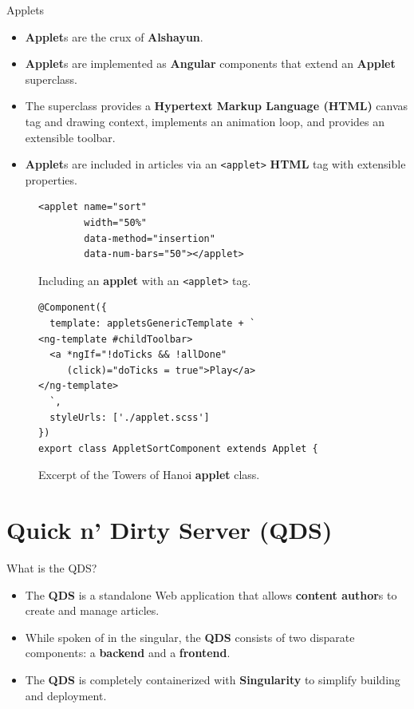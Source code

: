\documentclass{beamer}
\begin{document}
\begin{frame}{Applets}
    \begin{itemize}
        \item \textbf{Applet}s are the crux of \textbf{Alshayun}.
        \item \textbf{Applet}s are implemented as \textbf{Angular} components
            that extend an \textbf{Applet} superclass.
        \item The superclass provides a \textbf{Hypertext Markup Language
            (HTML)} canvas tag and drawing context, implements an animation
            loop, and provides an extensible toolbar.
        \item \textbf{Applet}s are included in articles via an \texttt{<applet>}
            \textbf{HTML} tag with extensible properties.
    \end{itemize}
    \begin{figure}
    \begin{verbatim}
<applet name="sort"
        width="50%"
        data-method="insertion"
        data-num-bars="50"></applet>
    \end{verbatim}
        \caption{Including an \textbf{applet} with an \texttt{<applet>} tag.}
    \end{figure}
    \begin{figure}
    \begin{verbatim}
@Component({
  template: appletsGenericTemplate + `
<ng-template #childToolbar>
  <a *ngIf="!doTicks && !allDone"
     (click)="doTicks = true">Play</a>
</ng-template>
  `,
  styleUrls: ['./applet.scss']
})
export class AppletSortComponent extends Applet {
    \end{verbatim}
        \caption{Excerpt of the Towers of Hanoi \textbf{applet} class.}
    \end{figure}
\end{frame}

\section{Quick n' Dirty Server (QDS)}

\begin{frame}{What is the QDS?}
    \begin{itemize}
        \item The \textbf{QDS} is a standalone Web application that allows
            \textbf{content author}s to create and manage articles.
        \item While spoken of in the singular, the \textbf{QDS} consists of two
            disparate components: a \textbf{backend} and a \textbf{frontend}.
        \item The \textbf{QDS} is completely containerized with
            \textbf{Singularity} to simplify building and deployment.
    \end{itemize}
\end{frame}
\end{document}
